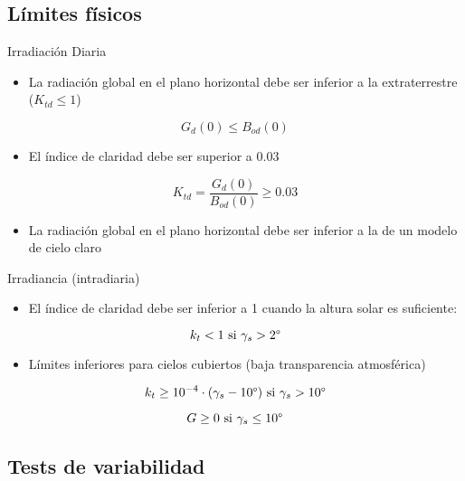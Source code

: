 \documentclass[aspectratio=169, usenames,svgnames,dvipsnames]{beamer}
\begin{document}
\subsection{Límites físicos}
\label{sec:orgee88b08}
\begin{frame}[label={sec:org94fc06c}]{Irradiación Diaria}
\begin{itemize}
\item La radiación global en el plano horizontal debe ser inferior a la extraterrestre (\(K_{td} \leq 1\))
\end{itemize}
\[
G_d(0) \leq B_{od}(0)
\]

\begin{itemize}
\item El índice de claridad debe ser superior a 0.03
\end{itemize}
\[
K_{td} = \frac{G_d(0)}{B_{od}(0)} \geq 0.03
\]

\begin{itemize}
\item La radiación global en el plano horizontal debe ser inferior a la de un modelo de cielo claro
\end{itemize}

\nocite{Younes.Claywell.ea2005, Estevez.Gavilan.ea2011, Geiger.Diabate.ea2002}
\end{frame}

\begin{frame}[label={sec:org530b20b}]{Irradiancia (intradiaria)}
\begin{itemize}
\item El índice de claridad debe ser inferior a 1 cuando la altura solar es suficiente:
\end{itemize}
\[
k_t < 1  \text{ si } \gamma_s > 2\degree 
\]
\begin{itemize}
\item Límites inferiores para cielos cubiertos (baja transparencia atmosférica)
\end{itemize}
\[
k_t \geq 10^{-4} \cdot (\gamma_s - 10\degree)  \text{ si } \gamma_s > 10\degree
\]

\[
G \geq 0  \text{ si } \gamma_s \leq 10\degree
\]

\nocite{Journee.Bertrand2011}
\end{frame}

\subsection{Tests de variabilidad}
\label{sec:org7a1cd70}
\end{document}
